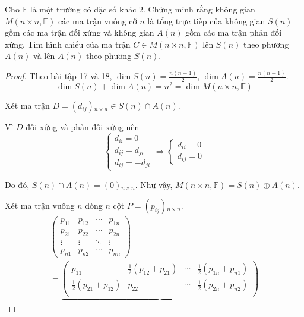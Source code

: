\documentclass[class=linearalgebra,crop=false]{standalone}
\begin{document}
\begin{exercise}
    Cho $\mathbb{F}$ là một trường có đặc số khác $2$. Chứng minh rằng không gian $M(n\times n, \mathbb{F})$ các ma trận vuông cỡ $n$ là tổng trực tiếp của không gian $S(n)$ gồm các ma trận đối xứng và không gian $A(n)$ gồm các ma trận phản đối xứng. Tìm hình chiếu của ma trận $C\in M(n\times n, \mathbb{F})$ lên $S(n)$ theo phương $A(n)$ và lên $A(n)$ theo phương $S(n)$.
\end{exercise}

\begin{proof}
    Theo bài tập 17 và 18, $\dim S(n) = \frac{n(n+1)}{2}$, $\dim A(n) = \frac{n(n-1)}{2}$.
    \[ \dim S(n) + \dim A(n) = n^{2} = \dim M(n\times n,\mathbb{F}) \]
    \par Xét ma trận $D = (d_{ij}){}_{n\times n} \in S(n)\cap A(n)$.
    \par Vì $D$ đối xứng và phản đối xứng nên
    \[
        \begin{cases}
            d_{ii} = 0      \\
            d_{ij} = d_{ji} \\
            d_{ij} = - d_{ji}
        \end{cases}
        \Longrightarrow
        \begin{cases}
            d_{ii} = 0 \\
            d_{ij} = 0
        \end{cases}
    \]
    \par Do đó, $S(n) \cap A(n) = (0){}_{n\times n}$. Như vậy, $M(n\times n,\mathbb{F}) = S(n)\oplus A(n)$.
    \par Xét ma trận vuông $n$ dòng $n$ cột $P = (p_{ij}){}_{n\times n}$.
    \begin{gather*}
        \begin{pmatrix}
            p_{11} & p_{12} & \cdots & p_{1n} \\
            p_{21} & p_{22} & \cdots & p_{2n} \\
            \vdots & \vdots & \ddots & \vdots \\
            p_{n1} & p_{n2} & \cdots & p_{nn}
        \end{pmatrix} \\
        =
        \underbrace{
            \begin{pmatrix}
                p_{11}                       & \frac{1}{2}(p_{12} + p_{21}) & \cdots & \frac{1}{2}(p_{1n} + p_{n1}) \\
                \frac{1}{2}(p_{21} + p_{12}) & p_{22}                       & \cdots & \frac{1}{2}(p_{2n} + p_{n2}) \\

\end{pmatrix}}
\end{gather*}
\end{proof}
\end{document}

